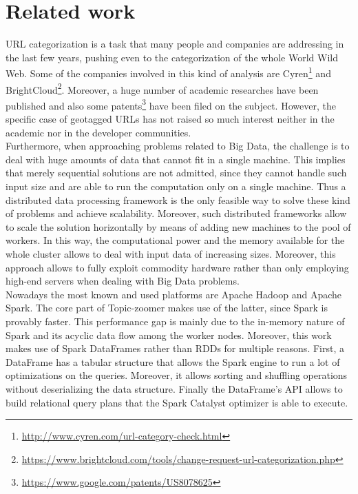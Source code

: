 \documentclass{sig-alternate-05-2015}
\begin{document}
\section{Related work}
URL categorization is a task that many people and companies are addressing in the last few years, pushing even to the categorization of the whole World Wild Web. Some of the companies involved in this kind of analysis are Cyren\footnote{\url{http://www.cyren.com/url-category-check.html}} and BrightCloud\footnote{\url{https://www.brightcloud.com/tools/change-request-url-categorization.php}}. Moreover, a huge number of academic researches have been published and also some patents\footnote{\url{https://www.google.com/patents/US8078625}} have been filed on the subject. However, the specific case of geotagged URLs has not raised so much interest neither in the academic nor in the developer communities.\\
Furthermore, when approaching problems related to Big Data, the challenge is to deal with huge amounts of data that cannot fit in a single machine. This implies that merely sequential solutions are not admitted, since they cannot handle such input size and are able to run the computation only on a single machine. Thus a distributed data processing framework is the only feasible way to solve these kind of problems and achieve scalability\cite{scalability_performances}. Moreover, such distributed frameworks allow to scale the solution horizontally by means of adding new machines to the pool of workers. In this way, the computational power and the memory available for the whole cluster allows to deal with input data of increasing sizes. Moreover, this approach allows to fully exploit commodity hardware rather than only employing high-end servers when dealing with Big Data problems.\\
Nowadays the most known and used platforms are Apache Hadoop and Apache Spark. The core part of Topic-zoomer makes use of the latter, since Spark is provably faster\cite{evaluation, evaluation2}. This performance gap is mainly due to the in-memory nature of Spark and its acyclic data flow among the worker nodes. Moreover, this work makes use of Spark DataFrames rather than RDDs for multiple reasons. First, a DataFrame has a tabular structure that allows the Spark engine to run a lot of optimizations on the queries. Moreover, it allows sorting and shuffling operations without deserializing the data structure. Finally the DataFrame's API allows to build relational query plans\cite{relational_query} that the Spark Catalyst optimizer is able to execute.
\end{document}
